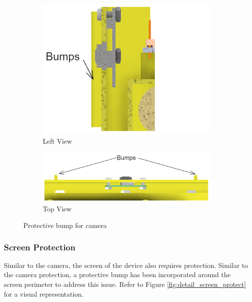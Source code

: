 \begin{figure}[!ht]
    \centering
    \begin{subfigure}[c]{0.47\textwidth}
        \begin{minipage}{\textwidth}
            \centering
            \includegraphics[height=4 cm]{texs/Part1/chapter4/image/d12.png}
        \end{minipage}
        \caption{Left View}
        \label{fig:detail_camera_left}
    \end{subfigure}
    \begin{subfigure}[c]{\textwidth}
        \begin{minipage}{\textwidth}
            \centering
            \includegraphics[width=0.75\linewidth]{texs/Part1/chapter4/image/d13.png}
        \end{minipage}
        \caption{Top View}
        \label{fig:detail_camera_top}
    \end{subfigure}
    \caption{Protective bump for camera}
    \label{fig:detail_camera_protect}
\end{figure}

\subsubsection{Screen Protection}
Similar to the camera, the screen of the device also requires protection. Similar to the camera protection, a protective bump has been incorporated around the screen perimeter to address this issue. Refer to Figure \ref{fig:detail_screen_protect} for a visual representation.

